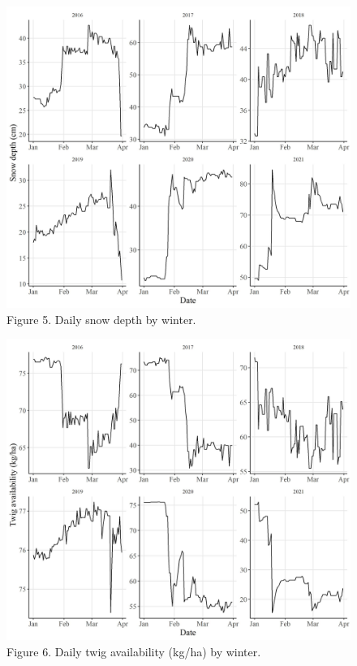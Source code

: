 \documentclass[
]{article}
\begin{document}
\begin{figure}
\centering
\includegraphics{Output/Figures/snow_daily_figure.jpeg}
\caption{Figure 5. Daily snow depth by winter.}
\end{figure}

\begin{figure}
\centering
\includegraphics{Output/Figures/twig_daily_figure.jpeg}
\caption{Figure 6. Daily twig availability (kg/ha) by winter.}
\end{figure}
\end{document}
